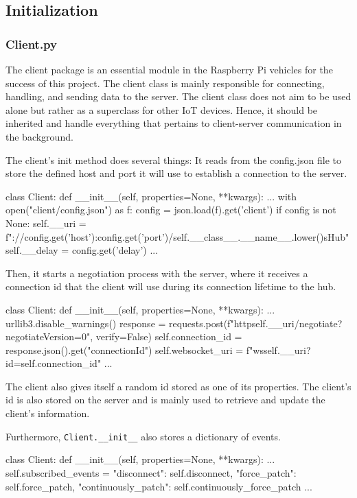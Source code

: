 \subsection{Initialization}\label{initialization}
\subsubsection{Client.py}
The client package is an essential module in the Raspberry Pi vehicles for the success of this project. The client class is mainly responsible for connecting, handling, and sending data to the server. The client class does not aim to be used alone but rather as a superclass for other IoT devices. Hence, it should be inherited and handle everything that pertains to client-server communication in the background.

The client's init method does several things: It reads from the config.json file to store the defined host and port it will use to establish a connection to the server.
\begin{python}
class Client:
	def __init__(self, properties=None, **kwargs):
		...
		with open("client/config.json") as f:
			config = json.load(f).get('client')
			if config is not None:
				self.__uri = f"://{config.get('host')}:{config.get('port')}/{self.__class__.__name__.lower()}sHub"
				self.__delay = config.get('delay')
		...
\end{python}

Then, it starts a negotiation process with the server, where it receives a connection id that the client will use during its connection lifetime to the hub.

\begin{python}
class Client:
	def __init__(self, properties=None, **kwargs):
		...
		urllib3.disable_warnings()
		response = requests.post(f"http{self.__uri}/negotiate?negotiateVersion=0", verify=False)
		self.connection_id = response.json().get("connectionId")
		self.websocket_uri = f"ws{self.__uri}?id={self.connection_id}"
		...
\end{python}

The client also gives itself a random id stored as one of its properties. The client's id is also stored on the server and is mainly used to retrieve and update the client's information.

Furthermore, \verb|Client.__init__| also stores a dictionary of events.
\begin{python}
class Client:
	def __init__(self, properties=None, **kwargs):
		...
		self.subscribed_events = {
			"disconnect": self.disconnect,
			"force_patch": self.force_patch,
			"continuously_patch": self.continuously_force_patch
		}
		...
\end{python}

